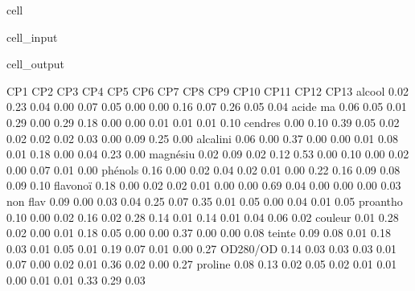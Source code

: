 \documentclass[letterpaper,10pt,english]{jupyterBook}
\begin{document}
\begin{sphinxuseclass}{cell}\begin{sphinxVerbatimInput}

\begin{sphinxuseclass}{cell_input}
\begin{sphinxVerbatim}[commandchars=\\\{\}]
  \PYG{p}{[}\PYG{p}{]}
    
      \PYG{p}{[}\PYG{p}{]}
        
        \PYG{p}{[}\PYG{p}{]}\PYG{p}{[}\PYG{p}{]}\PYG{p}{[}\PYG{p}{]}\PYG{p}{[}\PYG{p}{]}
     
\end{sphinxVerbatim}

\end{sphinxuseclass}\end{sphinxVerbatimInput}
\begin{sphinxVerbatimOutput}

\begin{sphinxuseclass}{cell_output}
\begin{sphinxVerbatim}[commandchars=\\\{\}]
            	CP1	CP2	CP3	CP4	CP5	CP6	CP7	CP8	CP9	CP10	CP11	CP12	CP13 
  \PYGZpc{} alcool	0.02 	0.23 	0.04 	0.00 	0.07 	0.05 	0.00 	0.00 	0.16 	0.07 	0.26 	0.05 	0.04
  acide ma	0.06 	0.05 	0.01 	0.29 	0.00 	0.29 	0.18 	0.00 	0.00 	0.01 	0.01 	0.01 	0.10
   cendres	0.00 	0.10 	0.39 	0.05 	0.02 	0.02 	0.02 	0.02 	0.03 	0.00 	0.09 	0.25 	0.00
  alcalini	0.06 	0.00 	0.37 	0.00 	0.00 	0.01 	0.08 	0.01 	0.18 	0.00 	0.04 	0.23 	0.00
  magnésiu	0.02 	0.09 	0.02 	0.12 	0.53 	0.00 	0.10 	0.00 	0.02 	0.00 	0.07 	0.01 	0.00
   phénols	0.16 	0.00 	0.02 	0.04 	0.02 	0.01 	0.00 	0.22 	0.16 	0.09 	0.08 	0.09 	0.10
  flavonoï	0.18 	0.00 	0.02 	0.02 	0.01 	0.00 	0.00 	0.69 	0.04 	0.00 	0.00 	0.00 	0.03
  non flav	0.09 	0.00 	0.03 	0.04 	0.25 	0.07 	0.35 	0.01 	0.05 	0.00 	0.04 	0.01 	0.05
  proantho	0.10 	0.00 	0.02 	0.16 	0.02 	0.28 	0.14 	0.01 	0.14 	0.01 	0.04 	0.06 	0.02
   couleur	0.01 	0.28 	0.02 	0.00 	0.01 	0.18 	0.05 	0.00 	0.00 	0.37 	0.00 	0.00 	0.08
    teinte	0.09 	0.08 	0.01 	0.18 	0.03 	0.01 	0.05 	0.01 	0.19 	0.07 	0.01 	0.00 	0.27
  OD280/OD	0.14 	0.03 	0.03 	0.03 	0.01 	0.07 	0.00 	0.02 	0.01 	0.36 	0.02 	0.00 	0.27
   proline	0.08 	0.13 	0.02 	0.05 	0.02 	0.01 	0.01 	0.00 	0.01 	0.01 	0.33 	0.29 	0.03
\end{sphinxVerbatim}


\end{sphinxuseclass}
\end{sphinxVerbatimOutput}
\end{sphinxuseclass}
\end{document}
